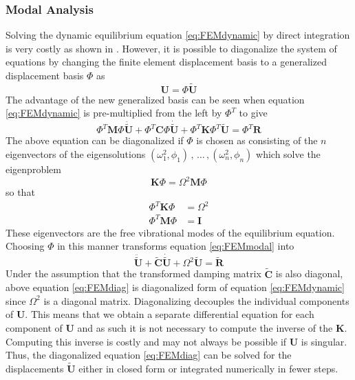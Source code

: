 \documentclass[11pt,a4paper]{report}
\begin{document}
\subsubsection{Modal Analysis}
Solving the dynamic equilibrium equation \ref{eq:FEMdynamic} by direct integration
is very costly as shown in \cite{FEMbook}. However, it is possible to diagonalize the system
of equations by changing the finite element displacement basis to a generalized displacement
basis $\Phi$ as 
\begin{equation}
\mathbf{U} = \Phi \mathbf{\tilde{U}}
\end{equation}
The advantage of the new generalized basis can be seen when equation \ref{eq:FEMdynamic} is pre-multiplied from the left by $\Phi^T$
to give
\begin{equation}\label{eq:FEMmodal}
\Phi^T\mathbf{M}\Phi\mathbf{\ddot{\tilde{U}}} + \Phi^T\mathbf{C}\Phi\mathbf{\dot{\tilde{U}}} + \Phi^T\mathbf{K}\Phi^T\mathbf{\tilde{U}}
= \Phi^T\mathbf{R}
\end{equation}
The above equation can be diagonalized if $\Phi$ is chosen as consisting of the $n$ eigenvectors of the eigensolutions $(\omega_1^2,\phi_1)\,,\, \dots \,,(\omega_n^2,\phi_n)$ which solve the eigenproblem
\begin{equation}\label{eq:FEMbasis}
\mathbf{K}\Phi = \Omega^2\mathbf{M}\Phi
\end{equation}
so that 
\begin{align}
\Phi^T\mathbf{K}\Phi &= \Omega^2\\
\Phi^T\mathbf{M}\Phi &= \mathbf{I}
\end{align}
These eigenvectors are the free vibrational modes of the equilibrium equation. Choosing $\Phi$ in this manner transforms equation \ref{eq:FEMmodal} into
\begin{equation}\label{eq:FEMdiag}
\mathbf{\ddot{\tilde{U}}} + \mathbf{\tilde{C}}\mathbf{\dot{\tilde{U}}} + \Omega^2\mathbf{\tilde{U}}
= \mathbf{\tilde{R}}
\end{equation}
Under the assumption that the transformed damping matrix $\mathbf{\tilde{C}}$ is also
diagonal, above equation \ref{eq:FEMdiag} is diagonalized form of equation
\ref{eq:FEMdynamic} since
$\Omega^2$ is a diagonal matrix.
Diagonalizing
decouples the individual components of $\mathbf{U}$. This means that we obtain a
separate differential equation for each component of $\mathbf{U}$ and as such it
is not necessary to compute the inverse of the $\mathbf{K}$. Computing this
inverse is costly and may not always be possible if $\mathbf{U}$ is singular. Thus, the
diagonalized equation \ref{eq:FEMdiag} can be solved for the displacements
$\mathbf{\tilde{U}}$ either in closed form or integrated numerically in fewer steps.
\end{document}
